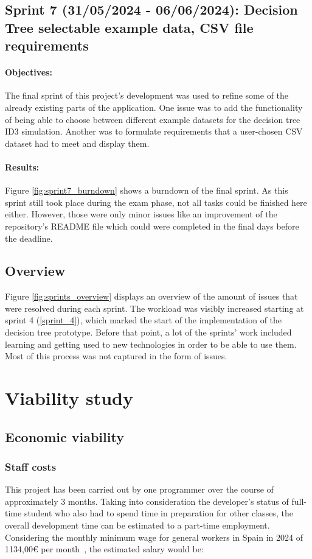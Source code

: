 \subsection{Sprint 7 (31/05/2024 - 06/06/2024): Decision Tree selectable example data, CSV file requirements}
\paragraph{Objectives:}
The final sprint of this project's development was used to refine some of the already existing parts of the application. One issue was to add the functionality of being able to choose between different example datasets for the decision tree ID3 simulation. Another was to formulate requirements that a user-chosen CSV dataset had to meet and display them.

\paragraph{Results:}
Figure \ref{fig:sprint7_burndown} shows a burndown of the final sprint. As this sprint still took place during the exam phase, not all tasks could be finished here either.  However, those were only minor issues like an improvement of the repository's README file which could were completed in the final days before the deadline.

\subsection{Overview}
Figure \ref{fig:sprints_overview} displays an overview of the amount of issues that were resolved during each sprint.
The workload was visibly increased starting at sprint 4 (\ref{sprint_4}), which marked the start of the implementation of the decision tree prototype. Before that point, a lot of the sprints' work included learning and getting used to new technologies in order to be able to use them. Most of this process was not captured in the form of issues. 

\section{Viability study}

\subsection{Economic viability}
\subsubsection{Staff costs}
This project has been carried out by one programmer over the course of approximately 3 months. Taking into consideration the developer's status of full-time student who also had to spend time in preparation for other classes, the overall development time can be estimated to a part-time employment. Considering the monthly minimum wage for general workers in Spain in 2024 of 1134,00€ per month~\cite{minimum_wage_spain_2024}, the estimated salary would be:

